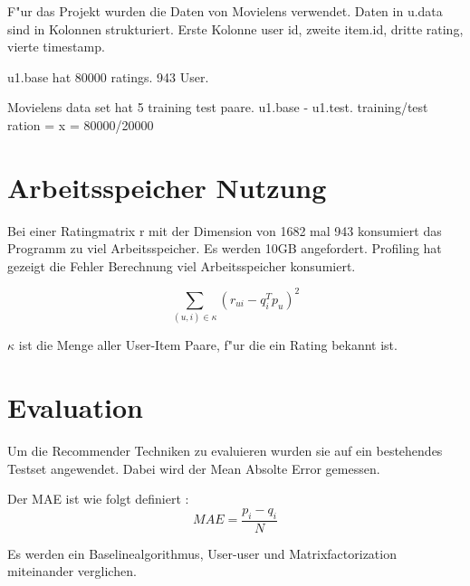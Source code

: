\documentclass[a4paper, 11pt]{article}
\begin{document}
F"ur das Projekt wurden die Daten von Movielens verwendet. Daten in u.data sind in Kolonnen strukturiert. Erste Kolonne user id, zweite item.id, dritte rating, vierte timestamp. 

u1.base hat 80000 ratings. 943 User.

Movielens data set hat 5 training test paare. u1.base - u1.test. 
training/test ration = x = 80000/20000

\section{Arbeitsspeicher Nutzung}
\label{sec:ram}

Bei einer Ratingmatrix r mit der Dimension von 1682 mal 943 konsumiert das Programm zu viel Arbeitsspeicher. Es werden 10GB angefordert. Profiling hat gezeigt die Fehler Berechnung viel Arbeitsspeicher konsumiert.

\begin{equation}
  \label{eq:squareerror}
  \sum_{(u,i) \in \kappa} (r_{ui} - q_i^T p_u)^2
\end{equation}

$\kappa$ ist die Menge aller User-Item Paare, f"ur die ein Rating bekannt ist.

\section{Evaluation}
\label{sec:evaluation}

Um die Recommender Techniken zu evaluieren wurden sie auf ein bestehendes Testset angewendet. Dabei wird der Mean Absolte Error gemessen.

Der MAE ist wie folgt definiert \cite{sarwar01}:
\begin{equation}
  \label{eq:mae}
  MAE = \frac{p_i-q_i}{N}
\end{equation}


Es werden ein Baselinealgorithmus, User-user und Matrixfactorization miteinander verglichen.



\end{document}
